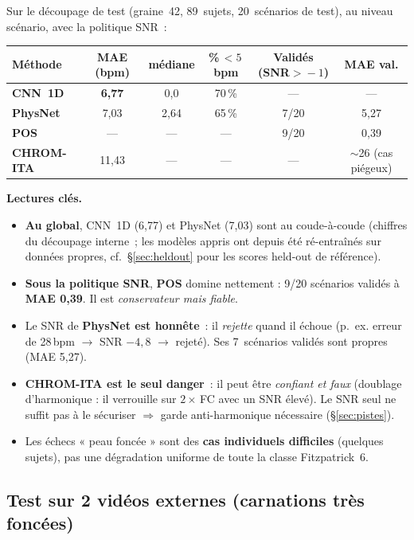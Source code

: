\documentclass[11pt,a4paper]{article}
\newcommand{\ok}[1]{\textcolor{good}{#1}}
\newcommand{\ko}[1]{\textcolor{bad}{#1}}
\begin{document}
Sur le découpage de test (graine~42, 89~sujets, 20~scénarios de test), au niveau
scénario, avec la politique SNR~:

\begin{center}
\begin{tabular}{@{}lccccc@{}}
\toprule
Méthode & MAE (bpm) & médiane & \%\,$<5$\,bpm & Validés (SNR$>\!-1$) & MAE val. \\
\midrule
\textbf{CNN~1D}    & \textbf{6,77} & 0,0 & 70\,\% & --- & --- \\
\textbf{PhysNet}   & 7,03 & 2,64 & 65\,\% & 7/20 & \ok{5,27} \\
\textbf{POS}       & --- & --- & --- & \ok{9/20} & \ok{0,39} \\
\textbf{CHROM-ITA} & 11,43 & --- & --- & --- & \ko{$\sim$26 (cas piégeux)} \\
\bottomrule
\end{tabular}
\end{center}

\noindent\textbf{Lectures clés.}
\begin{itemize}[leftmargin=1.4em]
\item \textbf{Au global}, CNN~1D (6,77) et PhysNet (7,03) sont au coude-à-coude
(chiffres du découpage interne~; les modèles appris ont depuis été ré-entraînés sur
données propres, cf.~§\ref{sec:heldout} pour les scores held-out de référence).
\item \textbf{Sous la politique SNR}, \textbf{POS} domine nettement : 9/20
scénarios validés à \textbf{MAE 0,39}. Il est \emph{conservateur mais fiable}.
\item Le SNR de \textbf{PhysNet est honnête}~: il \emph{rejette} quand il échoue
(p.~ex. erreur de 28\,bpm $\rightarrow$ SNR $-4{,}8$ $\rightarrow$ rejeté). Ses
7~scénarios validés sont propres (MAE 5,27).
\item \textbf{CHROM-ITA est le seul danger}~: il peut être \emph{confiant et faux}
(doublage d'harmonique : il verrouille sur $2\times$\,FC avec un SNR élevé).
Le SNR seul ne suffit pas à le sécuriser $\Rightarrow$ garde anti-harmonique
nécessaire (§\ref{sec:pistes}).
\item Les échecs « peau foncée » sont des \textbf{cas individuels difficiles}
(quelques sujets), pas une dégradation uniforme de toute la classe Fitzpatrick~6.
\end{itemize}

\subsection{Test sur 2 vidéos externes (carnations très foncées)}
\label{sec:extvideo}
\end{document}
